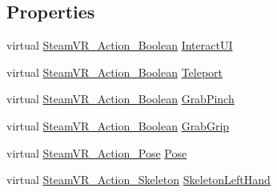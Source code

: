 \subsection*{Properties}
\begin{DoxyCompactItemize}
\item 
virtual \mbox{\hyperlink{class_valve_1_1_v_r_1_1_steam_v_r___action___boolean}{Steam\+V\+R\+\_\+\+Action\+\_\+\+Boolean}} \mbox{\hyperlink{class_valve_1_1_v_r_1_1_steam_v_r___input___action_set__default_a396cdd1ed0dae0a3cd65f820a343432d}{Interact\+UI}}
\item 
virtual \mbox{\hyperlink{class_valve_1_1_v_r_1_1_steam_v_r___action___boolean}{Steam\+V\+R\+\_\+\+Action\+\_\+\+Boolean}} \mbox{\hyperlink{class_valve_1_1_v_r_1_1_steam_v_r___input___action_set__default_aeb825a25fa8bde6250fb0e734d3fad40}{Teleport}}
\item 
virtual \mbox{\hyperlink{class_valve_1_1_v_r_1_1_steam_v_r___action___boolean}{Steam\+V\+R\+\_\+\+Action\+\_\+\+Boolean}} \mbox{\hyperlink{class_valve_1_1_v_r_1_1_steam_v_r___input___action_set__default_a4ec4a07ae606f78eb507a24a32f439d1}{Grab\+Pinch}}
\item 
virtual \mbox{\hyperlink{class_valve_1_1_v_r_1_1_steam_v_r___action___boolean}{Steam\+V\+R\+\_\+\+Action\+\_\+\+Boolean}} \mbox{\hyperlink{class_valve_1_1_v_r_1_1_steam_v_r___input___action_set__default_a4ba6486378feb0fc40aa8acd469fc056}{Grab\+Grip}}
\item 
virtual \mbox{\hyperlink{class_valve_1_1_v_r_1_1_steam_v_r___action___pose}{Steam\+V\+R\+\_\+\+Action\+\_\+\+Pose}} \mbox{\hyperlink{class_valve_1_1_v_r_1_1_steam_v_r___input___action_set__default_a86400c51bd834bc5712bf3259601eba2}{Pose}}
\item 
virtual \mbox{\hyperlink{class_valve_1_1_v_r_1_1_steam_v_r___action___skeleton}{Steam\+V\+R\+\_\+\+Action\+\_\+\+Skeleton}} \mbox{\hyperlink{class_valve_1_1_v_r_1_1_steam_v_r___input___action_set__default_adbcc5e3b71975f186f59f3483ad5b8c1}{Skeleton\+Left\+Hand}}
\item 

\end{DoxyCompactItemize}
